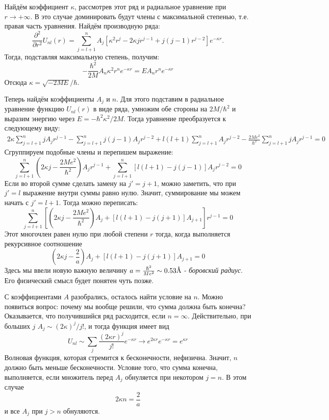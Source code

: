 Найдём коэффициент $\kappa$, рассмотрев этот ряд и радиальное уравнение при $r \rightarrow +\infty$. В это случае доминировать будут члены с максимальной степенью, т.е. правая часть уравнения. Найдём производную ряда:
\[
\frac{\partial^2}{\partial r^2} U_{nl}(r) =  \sum\limits_{j=l+1}^{n} A_j[\kappa^2r^j - 2\kappa jr^{j-1} + j(j-1)r^{j-2}]e^{-\kappa r}.
\]
Тогда, подставляя максимальную степень, получим:
\[
 -\frac{\hbar^2}{2M}A_n\kappa^2r^n e^{-\kappa r} = E A_n r^n e^{-\kappa r}
\]
Отсюда $\kappa = \sqrt{-2ME}/\hbar$.

Теперь найдём коэффициенты $A_j$ и $n$. Для этого подставим в радиальное уравнение функцию $U_{nl}(r)$ в виде ряда, умножим обе стороны на $2M/\hbar^2$ и выразим энергию через $E = -\hbar^2\kappa^2/2M$. Тогда уравнение преобразуется к следующему виду:
\begin{align*}
    2\kappa\sum\limits_{j = l+1}^n jA_j r^{j-1} - \sum\limits_{j = l+1}^n j(j-1)A_j r^{j-2} + l(l+1)\sum\limits_{j = l+1}^n A_j r^{j-2} - \frac{2Me^2}{\hbar^2}\sum\limits_{j = l+1}^n jA_j r^{j-1} =0
\end{align*}
Сгруппируем подобные члены и перепишем выражение:
\[
\sum\limits_{j = l+1}^n\left(2\kappa j - \frac{2Me^2}{\hbar^2}\right)A_j r^{j-1} + \sum\limits_{j = l+1}^n [l(l+1) - j(j-1)] A_j r^{j-2} =0
\]
Если во второй сумме сделать замену на $j' = j + 1$, можно заметить, что при $j'=l$ выражение внутри суммы равно нулю. Значит, суммирование мы можем начать с $j'= l+ 1$. Тогда можно переписать:
\[
\sum\limits_{j = l+1}^n\left[\left(2\kappa j - \frac{2Me^2}{\hbar^2}\right)A_j+ [l(l+1) - j(j+1)] A_{j+1} \right]r^{j-1} = 0
\]
Этот многочлен равен нулю при любой степени $r$ тогда, когда выполняется рекурсивное соотношение
\[
\left(2\kappa j - \frac{2}{a}\right)A_j+ [l(l+1) - j(j+1)] A_{j+1} = 0
\]
Здесь мы ввели новую важную величину $a = \frac{\hbar^2}{Me^2} \sim 0.53 \text{\r{A}}$ - \textit{боровский радиус}. Его физический смысл будет понятен чуть позже.

С коэффициентами $A$ разобрались, осталось найти условие на $n$. Можно появиться вопрос: почему мы вообще решили, что сумма должна быть конечна? Оказывается, что получившийся ряд расходится, если $n=\infty$. Действительно, при больших $j$ $A_j \sim (2\kappa)^j/j!$, и тогда функция имеет вид
\[
U_{nl} \sim \sum\limits_j\frac{(2\kappa r)^j}{j!}e^{-\kappa r} \rightarrow e^{2\kappa r}e^{-\kappa r} = e^{\kappa r}
\]
Волновая функция, которая стремится к бесконечности, нефизична. Значит, $n$ должно быть меньше бесконечности. Условие того, что сумма конечна, выполняется, если множитель перед $A_j$ обнуляется при некотором $j = n$. В этом случае
\[
2\kappa n = \frac{2}{a}
\]
и все $A_j$ при $j > n$ обнуляются.

